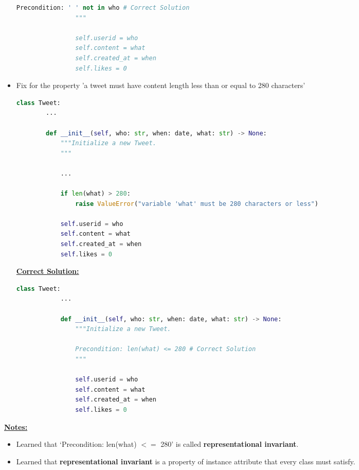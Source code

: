\documentclass[12pt]{article}
\begin{document}
\begin{itemize}
\begin{mdframed}
\begin{lstlisting}[language=Python]
                Precondition: ' ' not in who # Correct Solution
                """

                self.userid = who
                self.content = what
                self.created_at = when
                self.likes = 0
        \end{lstlisting}
    \end{mdframed}


    \item Fix for the property 'a tweet must have content length less than or
    equal to 280 characters'

    \begin{lstlisting}[language=Python]
    class Tweet:
        ...

        def __init__(self, who: str, when: date, what: str) -> None:
            """Initialize a new Tweet.
            """

            ...

            if len(what) > 280:
                raise ValueError("variable 'what' must be 280 characters or less")

            self.userid = who
            self.content = what
            self.created_at = when
            self.likes = 0
    \end{lstlisting}

    \bigskip

    \begin{mdframed}
        \underline{\textbf{Correct Solution:}}

        \bigskip

        \begin{lstlisting}[language=Python]
        class Tweet:
            ...

            def __init__(self, who: str, when: date, what: str) -> None:
                """Initialize a new Tweet.

                Precondition: len(what) <= 280 # Correct Solution
                """

                self.userid = who
                self.content = what
                self.created_at = when
                self.likes = 0
        \end{lstlisting}
    \end{mdframed}

\end{itemize}

\bigskip

\underline{\textbf{Notes:}}

\begin{itemize}
    \item Learned that `Precondition: len(what) $<=$ 280' is called \textbf{representational invariant}.
    \item Learned that \textbf{representational invariant} is a property of instance attribute that
    every class must satisfy.
\end{itemize}
\end{document}
